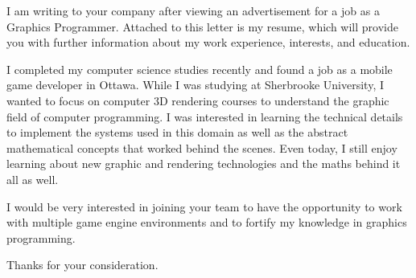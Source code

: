 \documentclass[11pt,arial]{moderncv}        %
\begin{document}
I am writing to your company after viewing an advertisement for a job as a Graphics Programmer. Attached to this letter is my resume, which will provide you with further information about my work experience, interests, and education.

I completed my computer science studies recently and found a job as a mobile game developer in Ottawa. While I was studying at Sherbrooke University, I wanted to focus on computer 3D rendering courses to understand the graphic field of computer programming. I was interested in learning the technical details to implement the systems used in this domain as well as the abstract mathematical concepts that worked behind the scenes. Even today, I still enjoy learning about new graphic and rendering technologies and the maths behind it all as well.

I would be very interested in joining your team to have the opportunity to work with multiple game engine environments and to fortify my knowledge in graphics programming.

Thanks for your consideration.

\makeletterclosing
\end{document}
